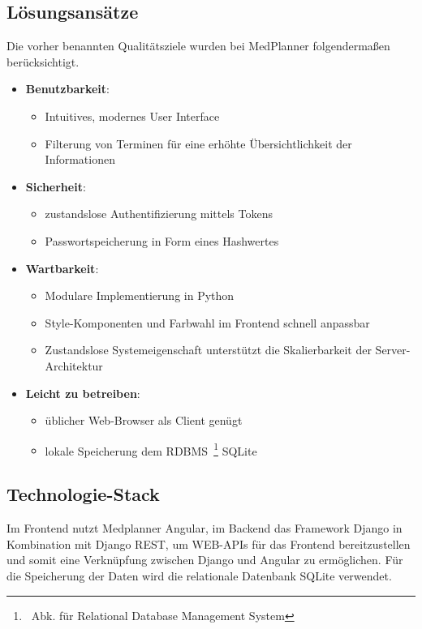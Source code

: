 \documentclass[conference]{IEEEtran}
\begin{document}
\subsection{Lösungsansätze}
Die vorher benannten Qualitätsziele wurden bei MedPlanner folgendermaßen berücksichtigt.\\
\begin{itemize}
	\item \textbf{Benutzbarkeit}:
	\begin{itemize}
		\item Intuitives, modernes User Interface
		\item Filterung von Terminen für eine erhöhte Übersichtlichkeit der Informationen
	\end{itemize}
	\pagebreak
	\item \textbf{Sicherheit}:
	\begin{itemize}
		\item zustandslose Authentifizierung mittels Tokens
		\item Passwortspeicherung in Form eines Hashwertes
	\end{itemize}
	\item \textbf{Wartbarkeit}:
	\begin{itemize}
		\item Modulare Implementierung in Python
		\item Style-Komponenten und Farbwahl im Frontend schnell anpassbar
		\item Zustandslose Systemeigenschaft unterstützt die Skalierbarkeit der Server-Architektur
	\end{itemize}
	\item \textbf{Leicht zu betreiben}:
	\begin{itemize}
		\item üblicher Web-Browser als Client genügt
		\item lokale Speicherung dem RDBMS~\footnote{~Abk. für Relational Database Management System} SQLite
	\end{itemize}	
\end{itemize}

\subsection{Technologie-Stack}
Im Frontend nutzt Medplanner Angular, im Backend das Framework Django in Kombination mit Django REST, um WEB-APIs für das Frontend bereitzustellen und somit eine Verknüpfung zwischen Django und Angular zu ermöglichen. Für die Speicherung der Daten wird die relationale Datenbank SQLite verwendet. 
\end{document}
